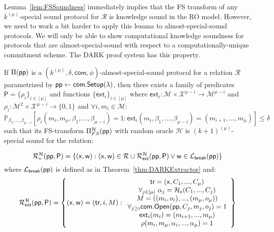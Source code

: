 Lemma~\ref{lem:FSSoundness} immediately implies that the FS transform of any $k^{(\mu)}$-special sound protocol for $\mathcal{R}$ is knowledge sound in the RO model. However, we need to work a bit harder to apply this lemma to almost-special-sound protocols. We will only be able to show computational knowledge soundness for protocols that are almost-special-sound with respect to a computationally-unique commitment scheme. The DARK proof system has this property. 
\begin{lemma} \label{lem:RODARKSpecial}
If $\Pi(\textsf{pp})$ is a $(k^{(\mu)}, \delta, \textsf{com} , \phi)$-almost-special-sound protocol for a relation $\mathcal{R}$ parametrized by $\textsf{pp} \gets \textsf{com}.\textsf{{Setup}}(\lambda)$, then there exists a family of predicates $\textsf{P} = \{\rho_i\}_{i \in [\mu]}$ and functions $\{ \textsf{ext}_i\}_{i \in [\mu]}$ where $\textsf{ext}_i: \mathcal{M} \times \mathcal{X}^{\mu - i} \rightarrow \mathcal{M}^{\mu - i}$ and $\rho_i: \mathcal{M}^2 \times \mathcal{X}^{\mu - i} \rightarrow \{0,1\}$ and $\forall i, m_i \in \mathcal{M}$: 
$$\mathbb{P}_{\beta_1,...,\beta_{\mu - i}}[\rho_i(m_i, m_\mu, \beta_1,...,\beta_{\mu - i}) = 1: \textsf{ext}_i(m_i, \beta_1,...,\beta_{\mu - i}) = (m_{i+1},...,m_\mu)] \leq \delta $$
   such that its FS-transform $\Pi^{\mathcal{H}}_{FS}(\textsf{pp})$ with random oracle $\mathcal{H}$ is $(k+1)^{(\mu)}$-special sound for the relation: 

$$\mathcal{R}^\mathcal{H}_*(\textsf{pp}, \textsf{P}) = \{ (\mathsf{x}, \mathsf{w}): (\mathsf{x}, \mathsf{w}) \in \mathcal{R} \cup \mathcal{R}^{\mathcal{H}}_\textsf{ext}(\textsf{pp}, \textsf{P}) \vee \mathsf{w} \in \mathcal{L}_\textsf{break}(\textsf{pp}) \} $$ 	
where $\mathcal{L}_\textsf{break}(\textsf{pp})$ is defined as in Theorem~\ref{thm:DARKExtractor} and:
$$\mathcal{R}^{\mathcal{H}}_\textsf{ext}(\textsf{pp}, \textsf{P}) = \left\{(\mathsf{x}, \mathsf{w}) = (\textsf{{tr}}, i, M): \begin{array}{c} \textsf{{tr}} = (\mathsf{x}, C_1,...,C_\mu) \\ \forall_{j \in [\mu]} \ \alpha_j = \mathcal{H}_\mathsf{x}(C_1,...,C_j) \\ M = ((m_i,o_i),...,(m_\mu, o_\mu)) \\ \forall_{j \geq i} \textsf{com}.\textsf{{Open}}(\textsf{pp},C_j, m_j, o_j) = 1 \\ \textsf{ext}_i(m_i) = (m_{i+1},...,m_\mu) \\ \rho(m_i, m_\mu, \alpha_i,...,\alpha_\mu) = 1  \end{array} \right\} $$ 

\end{lemma}
\fi 

